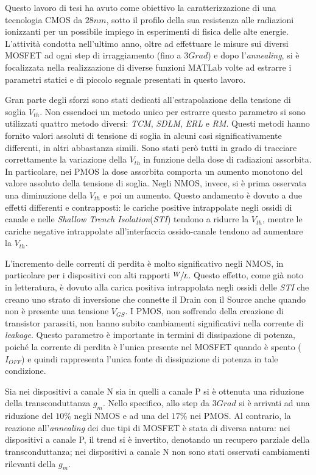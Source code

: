 Questo lavoro di tesi ha avuto come obiettivo la caratterizzazione di una tecnologia CMOS da $28nm$, sotto il profilo della sua resistenza alle radiazioni ionizzanti per un possibile impiego in esperimenti di fisica delle alte energie. L'attività condotta nell'ultimo anno, oltre ad effettuare le misure sui diversi MOSFET ad ogni step di irraggiamento (fino a $3Grad$) e dopo l'\textit{annealing}, si è focalizzata nella realizzazione di diverse funzioni MATLab volte ad estrarre i parametri statici e di piccolo segnale presentati in questo lavoro.

\vspace{0.5cm}

Gran parte degli sforzi sono stati dedicati all'estrapolazione della tensione di soglia $V_{th}$. Non essendoci un metodo unico per estrarre questo parametro si sono utilizzati quattro metodo diversi: \textit{TCM}, \textit{SDLM}, \textit{ERL} e \textit{RM}. Questi metodi hanno fornito valori assoluti di tensione di soglia in alcuni casi significativamente differenti, in altri abbastanza simili. Sono stati però tutti in grado di tracciare correttamente la variazione della $V_{th}$ in funzione della dose di radiazioni assorbita. In particolare, nei PMOS la dose assorbita comporta un aumento monotono del valore assoluto della tensione di soglia. Negli NMOS, invece, si è prima osservata una diminuzione della $V_{th}$ e poi un aumento. Questo andamento è dovuto a due effetti differenti e contrapposti: le cariche positive intrappolate negli ossidi di canale e nelle \emph{Shallow Trench Isolation}(\emph{STI}) tendono a ridurre la $V_{th}$, mentre le cariche negative intrappolate all'interfaccia ossido-canale tendono ad aumentare la $V_{th}$.

L'incremento delle correnti di perdita è molto significativo negli NMOS, in particolare per i dispositivi con alti rapporti $\sfrac{W}{L}$. Questo effetto, come già noto in letteratura, è dovuto alla carica positiva intrappolata negli ossidi delle \emph{STI} che creano uno strato di inversione che connette il Drain con il Source anche quando non è presente una tensione $V_{GS}$. I PMOS, non soffrendo della creazione di transistor parassiti, non hanno subito cambiamenti significativi nella corrente di \emph{leakage}. Questo parametro è importante in termini di dissipazione di potenza, poiché la corrente di perdita è l'unica presente nel MOSFET quando è spento ($I_{OFF}$) e quindi rappresenta l'unica fonte di dissipazione di potenza in tale condizione.   

Sia nei dispositivi a canale N sia in quelli a canale P si è ottenuta una riduzione della transconduttanza $g_m$. Nello specifico, allo step da $3Grad$ si è arrivati ad una riduzione del $10\%$ negli NMOS e ad una del $17\%$ nei PMOS. Al contrario, la reazione all'\textit{annealing} dei due tipi di MOSFET è stata di diversa natura: nei dispositivi a canale P, il trend si è invertito, denotando un recupero parziale della transconduttanza; nei dispositivi a canale N non sono stati osservati cambiamenti rilevanti della $g_m$.    

   